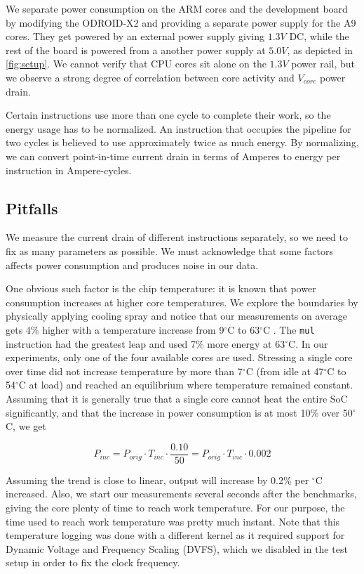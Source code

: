 We separate power consumption on the ARM cores and the development board by
modifying the ODROID-X2 and providing a separate power supply for the A9 cores.
They get powered by an external power supply giving $1.3V$ DC, while the rest of
the board is powered from a another power supply at $5.0V$, as depicted in
\autoref{fig:setup}. We cannot verify that CPU cores sit alone on the $1.3V$
power rail, but we observe a strong degree of correlation between core activity
and $V_{core}$ power drain.

Certain instructions use more than one cycle to complete their work, so the
energy usage has to be normalized. An instruction that occupies the pipeline for
two cycles is believed to use approximately twice as much energy. By
normalizing, we can convert point-in-time current drain in terms of Amperes
to energy per instruction in Ampere-cycles.

\subsection{Pitfalls}
We measure the current drain of different instructions separately, so we need
to fix as many parameters as possible. We must acknowledge that some factors
affects power consumption and produces noise in our data.

\label{sec:temperature}
One obvious such factor is the chip temperature: it is known that power
consumption increases at higher core temperatures. We explore the boundaries by
physically applying cooling spray and notice that our measurements on average
gets 4\% higher with a temperature increase from 9$^\circ$C to 63$^\circ$C . The
\texttt{mul} instruction had the greatest leap and used 7\% more energy at
63$^\circ$C. In our experiments, only one of the four available cores are
used.  Stressing a single core over time did not increase temperature by more
than 7$^\circ$C (from idle at 47$^\circ$C to 54$^\circ$C at load) and reached
an equilibrium where temperature remained constant. Assuming that it is
generally true that a single core cannot heat the entire SoC significantly, and
that the increase in power consumption is at most 10\% over 50$^\circ$C, we get

\begin{equation}
    P_{inc} = P_{orig} \cdot T_{inc} \cdot \frac{0.10}{50} = P_{orig} \cdot T_{inc} \cdot 0.002
\end{equation}

Assuming the trend is close to linear, output will increase by 0.2\% per
$^\circ$C increased. Also, we start our measurements several seconds after the
benchmarks, giving the core plenty of time to reach work temperature. For our
purpose, the time used to reach work temperature was pretty much instant. Note
that this temperature logging was done with a different kernel as it required
support for Dynamic Voltage and Frequency Scaling (DVFS), which we
disabled in the test setup in order to fix the clock frequency.

